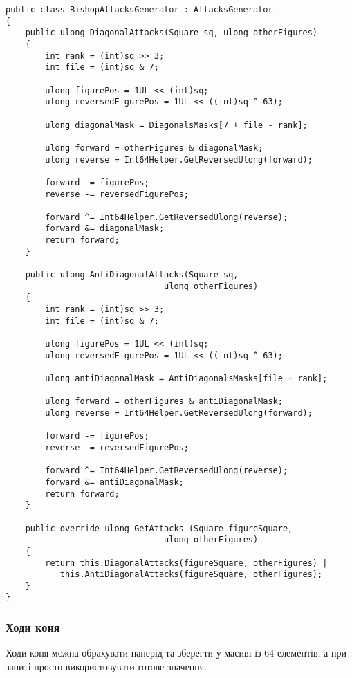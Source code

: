 \documentclass[12pt,a4paper]{article}
\begin{document}
\singlespacing
\begin{lstlisting}
public class BishopAttacksGenerator : AttacksGenerator
{
    public ulong DiagonalAttacks(Square sq, ulong otherFigures)
    {	
        int rank = (int)sq >> 3;
        int file = (int)sq & 7;

        ulong figurePos = 1UL << (int)sq;
        ulong reversedFigurePos = 1UL << ((int)sq ^ 63);

        ulong diagonalMask = DiagonalsMasks[7 + file - rank];

        ulong forward = otherFigures & diagonalMask;
        ulong reverse = Int64Helper.GetReversedUlong(forward);

        forward -= figurePos;
        reverse -= reversedFigurePos;

        forward ^= Int64Helper.GetReversedUlong(reverse);
        forward &= diagonalMask;
        return forward;
    }

    public ulong AntiDiagonalAttacks(Square sq,
                                ulong otherFigures)
    {
        int rank = (int)sq >> 3;
        int file = (int)sq & 7;

        ulong figurePos = 1UL << (int)sq;
        ulong reversedFigurePos = 1UL << ((int)sq ^ 63);

        ulong antiDiagonalMask = AntiDiagonalsMasks[file + rank];

        ulong forward = otherFigures & antiDiagonalMask;
        ulong reverse = Int64Helper.GetReversedUlong(forward);

        forward -= figurePos;
        reverse -= reversedFigurePos;

        forward ^= Int64Helper.GetReversedUlong(reverse);
        forward &= antiDiagonalMask;
        return forward;
    }

    public override ulong GetAttacks (Square figureSquare,
                                ulong otherFigures)
    {
        return this.DiagonalAttacks(figureSquare, otherFigures) | 
           this.AntiDiagonalAttacks(figureSquare, otherFigures);
    }
}
\end{lstlisting}

\fontsize{14pt}{6mm}\selectfont

\subsubsection{Ходи коня}

Ходи коня можна обрахувати наперід та зберегти у масиві із 64 елементів, а
при запиті просто використовувати готове значення.
\end{document}
